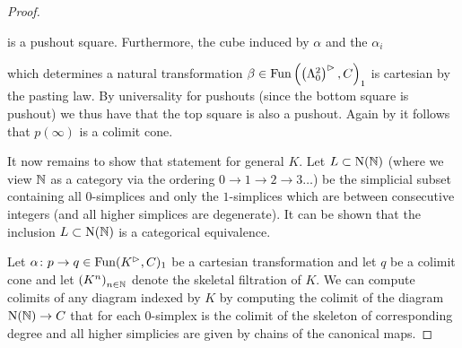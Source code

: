 \begin{lemma}
\begin{proof}
\begin{center}
        \end{center}
        is a pushout square.
        Furthermore, the cube induced by $\alpha$ and the $\alpha_i$
        \begin{center}
        \end{center}
        which determines a natural transformation $\beta\in\operatorname{Fun}\left(\left(\Lambda_0^2\right)^{\rhd},C\right)_1$ is cartesian by the pasting law.
        By universality for pushouts (since the bottom square is pushout) we thus have that the top square is also a pushout.
        Again by %
        it follows that $p(\infty)$ is a colimit cone.

        It now remains to show that statement for general $K$.
        Let $L\subset\operatorname{N}(\mathbb{N})$ (where we view $\mathbb{N}$ as a category via the ordering $0\to1\to2\to3\ldots$) be the simplicial subset containing all $0$-simplices and only the $1$-simplices which are between consecutive integers (and all higher simplices are degenerate).
        It can be shown that the inclusion $L\subset\operatorname{N}(\mathbb{N})$ is a categorical equivalence. %

        Let $\alpha\colon p\to q\in\operatorname{Fun}(K^{\rhd},C)_1$ be a cartesian transformation and let $q$ be a colimit cone and let $\left(K^n\right)_{n\in\mathbb{N}}$ denote the skeletal filtration of $K$.
        We can compute colimits of any diagram indexed by $K$ by computing the colimit of the diagram $\operatorname{N}(\mathbb{N})\to C$ that for each $0$-simplex is the colimit of the skeleton of corresponding degree and all higher simplicies are given by chains of the canonical maps. 


\end{proof}
\end{lemma}
